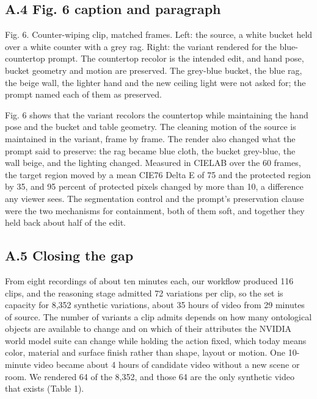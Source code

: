 \documentclass[
  11pt,
]{article}
\begin{document}
\subsection{A.4 Fig. 6 caption and
paragraph}\label{a.4-fig.-6-caption-and-paragraph}

Fig. 6. Counter-wiping clip, matched frames. Left: the source, a white
bucket held over a white counter with a grey rag. Right: the variant
rendered for the blue-countertop prompt. The countertop recolor is the
intended edit, and hand pose, bucket geometry and motion are preserved.
The grey-blue bucket, the blue rag, the beige wall, the lighter hand and
the new ceiling light were not asked for; the prompt named each of them
as preserved.

Fig. 6 shows that the variant recolors the countertop while maintaining
the hand pose and the bucket and table geometry. The cleaning motion of
the source is maintained in the variant, frame by frame. The render also
changed what the prompt said to preserve: the rag became blue cloth, the
bucket grey-blue, the wall beige, and the lighting changed. Measured in
CIELAB over the 60 frames, the target region moved by a mean CIE76 Delta
E of 75 and the protected region by 35, and 95 percent of protected
pixels changed by more than 10, a difference any viewer sees. The
segmentation control and the prompt's preservation clause were the two
mechanisms for containment, both of them soft, and together they held
back about half of the edit.

\subsection{A.5 Closing the gap}\label{a.5-closing-the-gap}

From eight recordings of about ten minutes each, our workflow produced
116 clips, and the reasoning stage admitted 72 variations per clip, so
the set is capacity for 8,352 synthetic variations, about 35 hours of
video from 29 minutes of source. The number of variants a clip admits
depends on how many ontological objects are available to change and on
which of their attributes the NVIDIA world model suite can change while
holding the action fixed, which today means color, material and surface
finish rather than shape, layout or motion. One 10-minute video became
about 4 hours of candidate video without a new scene or room. We
rendered 64 of the 8,352, and those 64 are the only synthetic video that
exists (Table 1).
\end{document}
